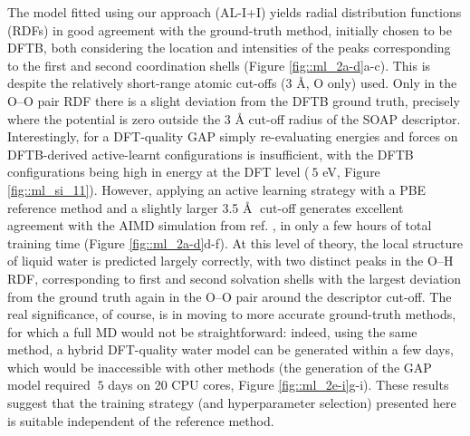 \documentclass[../../main.tex]{subfiles}
\begin{document}
The model fitted using our approach (AL-I+I) yields radial distribution functions (RDFs) in good agreement with the ground-truth method, initially chosen to be DFTB, both considering the location and intensities of the peaks corresponding to the first and second coordination shells (Figure \ref{fig::ml_2a-d}a-c). This is despite the relatively short-range atomic cut-offs (3 \AA, O only) used. Only in the O–O pair RDF there is a slight deviation from the DFTB ground truth, precisely where the potential is zero outside the 3 Å cut-off radius of the SOAP descriptor. Interestingly, for a DFT-quality GAP simply re-evaluating energies and forces on DFTB-derived active-learnt configurations is insufficient, with the DFTB configurations being high in energy at the DFT level ($~5$ eV, Figure \ref{fig::ml_si_11}). However, applying an active learning strategy with a PBE reference method and a slightly larger 3.5 \AA$\;$ cut-off generates excellent agreement with the AIMD simulation from ref. \cite{Zheng2018}, in only a few hours of total training time (Figure \ref{fig::ml_2a-d}d-f). At this level of theory, the local structure of liquid water is predicted largely correctly, with two distinct peaks in the O--H RDF, corresponding to first and second solvation shells with the largest deviation from the ground truth again in the O--O pair around the descriptor cut-off. The real significance, of course, is in moving to more accurate ground-truth methods, for which a full MD would not be straightforward: indeed, using the same method, a hybrid DFT-quality water model can be generated within a few days, which would be inaccessible with other methods (the generation of the GAP model required $~5$ days on 20 CPU cores, Figure \ref{fig::ml_2e-i}g-i). These results suggest that the training strategy (and hyperparameter selection) presented here is suitable independent of the reference method.
\end{document}
